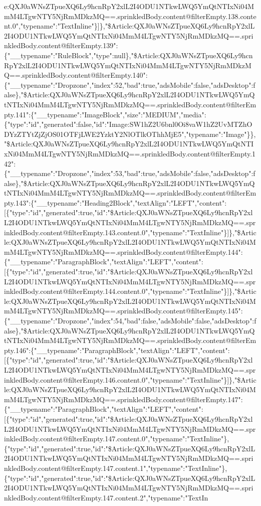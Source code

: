 e:QXJ0aWNsZTpueXQ6Ly9hcnRpY2xlL2I4ODU1NTkwLWQ5YmQtNTIxNi04MmM4LTgwNTY5NjRmMDkzMQ==.sprinkledBody.content@filterEmpty.138.content.0","typename":"TextInline"\}{]}\},"\$Article:QXJ0aWNsZTpueXQ6Ly9hcnRpY2xlL2I4ODU1NTkwLWQ5YmQtNTIxNi04MmM4LTgwNTY5NjRmMDkzMQ==.sprinkledBody.content@filterEmpty.139":\{"\_\_typename":"RuleBlock","type":null\},"\$Article:QXJ0aWNsZTpueXQ6Ly9hcnRpY2xlL2I4ODU1NTkwLWQ5YmQtNTIxNi04MmM4LTgwNTY5NjRmMDkzMQ==.sprinkledBody.content@filterEmpty.140":\{"\_\_typename":"Dropzone","index":52,"bad":true,"adsMobile":false,"adsDesktop":false\},"\$Article:QXJ0aWNsZTpueXQ6Ly9hcnRpY2xlL2I4ODU1NTkwLWQ5YmQtNTIxNi04MmM4LTgwNTY5NjRmMDkzMQ==.sprinkledBody.content@filterEmpty.141":\{"\_\_typename":"ImageBlock","size":"MEDIUM","media":\{"type":"id","generated":false,"id":"Image:SW1hZ2U6bnl0Oi8vaW1hZ2UvMTZhODYzZTYtZjZjOS01OTFjLWE2YzktY2NlOTlkOThhMjE5","typename":"Image"\}\},"\$Article:QXJ0aWNsZTpueXQ6Ly9hcnRpY2xlL2I4ODU1NTkwLWQ5YmQtNTIxNi04MmM4LTgwNTY5NjRmMDkzMQ==.sprinkledBody.content@filterEmpty.142":\{"\_\_typename":"Dropzone","index":53,"bad":true,"adsMobile":false,"adsDesktop":false\},"\$Article:QXJ0aWNsZTpueXQ6Ly9hcnRpY2xlL2I4ODU1NTkwLWQ5YmQtNTIxNi04MmM4LTgwNTY5NjRmMDkzMQ==.sprinkledBody.content@filterEmpty.143":\{"\_\_typename":"Heading2Block","textAlign":"LEFT","content":{[}\{"type":"id","generated":true,"id":"\$Article:QXJ0aWNsZTpueXQ6Ly9hcnRpY2xlL2I4ODU1NTkwLWQ5YmQtNTIxNi04MmM4LTgwNTY5NjRmMDkzMQ==.sprinkledBody.content@filterEmpty.143.content.0","typename":"TextInline"\}{]}\},"\$Article:QXJ0aWNsZTpueXQ6Ly9hcnRpY2xlL2I4ODU1NTkwLWQ5YmQtNTIxNi04MmM4LTgwNTY5NjRmMDkzMQ==.sprinkledBody.content@filterEmpty.144":\{"\_\_typename":"ParagraphBlock","textAlign":"LEFT","content":{[}\{"type":"id","generated":true,"id":"\$Article:QXJ0aWNsZTpueXQ6Ly9hcnRpY2xlL2I4ODU1NTkwLWQ5YmQtNTIxNi04MmM4LTgwNTY5NjRmMDkzMQ==.sprinkledBody.content@filterEmpty.144.content.0","typename":"TextInline"\}{]}\},"\$Article:QXJ0aWNsZTpueXQ6Ly9hcnRpY2xlL2I4ODU1NTkwLWQ5YmQtNTIxNi04MmM4LTgwNTY5NjRmMDkzMQ==.sprinkledBody.content@filterEmpty.145":\{"\_\_typename":"Dropzone","index":54,"bad":false,"adsMobile":false,"adsDesktop":false\},"\$Article:QXJ0aWNsZTpueXQ6Ly9hcnRpY2xlL2I4ODU1NTkwLWQ5YmQtNTIxNi04MmM4LTgwNTY5NjRmMDkzMQ==.sprinkledBody.content@filterEmpty.146":\{"\_\_typename":"ParagraphBlock","textAlign":"LEFT","content":{[}\{"type":"id","generated":true,"id":"\$Article:QXJ0aWNsZTpueXQ6Ly9hcnRpY2xlL2I4ODU1NTkwLWQ5YmQtNTIxNi04MmM4LTgwNTY5NjRmMDkzMQ==.sprinkledBody.content@filterEmpty.146.content.0","typename":"TextInline"\}{]}\},"\$Article:QXJ0aWNsZTpueXQ6Ly9hcnRpY2xlL2I4ODU1NTkwLWQ5YmQtNTIxNi04MmM4LTgwNTY5NjRmMDkzMQ==.sprinkledBody.content@filterEmpty.147":\{"\_\_typename":"ParagraphBlock","textAlign":"LEFT","content":{[}\{"type":"id","generated":true,"id":"\$Article:QXJ0aWNsZTpueXQ6Ly9hcnRpY2xlL2I4ODU1NTkwLWQ5YmQtNTIxNi04MmM4LTgwNTY5NjRmMDkzMQ==.sprinkledBody.content@filterEmpty.147.content.0","typename":"TextInline"\},\{"type":"id","generated":true,"id":"\$Article:QXJ0aWNsZTpueXQ6Ly9hcnRpY2xlL2I4ODU1NTkwLWQ5YmQtNTIxNi04MmM4LTgwNTY5NjRmMDkzMQ==.sprinkledBody.content@filterEmpty.147.content.1","typename":"TextInline"\},\{"type":"id","generated":true,"id":"\$Article:QXJ0aWNsZTpueXQ6Ly9hcnRpY2xlL2I4ODU1NTkwLWQ5YmQtNTIxNi04MmM4LTgwNTY5NjRmMDkzMQ==.sprinkledBody.content@filterEmpty.147.content.2","typename":"TextIn